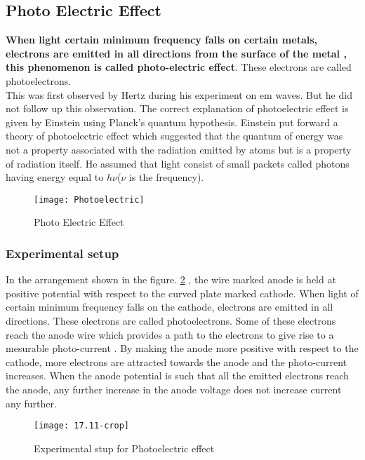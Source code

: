 \subsection{Photo Electric Effect}
\textbf{When light certain minimum frequency falls on certain metals, electrons are emitted in all directions from the surface of the metal ,  this phenomenon is called photo-electric effect}. These electrons are called photoelectrons.\\
This was first observed by Hertz during his experiment on em waves. But he did not follow up this observation. The correct explanation of photoelectric effect is given by Einstein using Planck's quantum hypothesis. Einstein put forward a theory of photoelectric effect which suggested that the quantum of energy was not a property associated with the radiation emitted by atoms but is a property of radiation itself.  He assumed that light consist of small packets called photons having energy equal to $h\nu$($\nu$ is the frequency). 
\begin{figure}[H]
	\centering
	\texttt{[image: Photoelectric]}
	\caption{Photo Electric Effect}
	\label{Photo Electric Effect}
\end{figure}
\subsubsection{Experimental setup} 
In the arrangement shown in the figure. \ref{Photoelectric effect} , the wire marked anode is held at positive potential with respect to the curved plate marked cathode.  When light of certain minimum frequency falls on the cathode, electrons are emitted in all directions. These electrons are called photoelectrons. Some of these electrons reach the anode wire which provides a path to the electrons to give rise to a mesurable photo-current . By making the anode more positive with respect to the cathode, more electrons are attracted towards the anode and the photo-current increases. When the anode potential is such that all the emitted electrons reach the anode, any further increase in the anode voltage does not increase current any further.
\begin{figure}[H]
	\centering
	\texttt{[image: 17.11-crop]}
	\caption{Experimental stup for Photoelectric effect}
	\label{Photoelectric effect}
\end{figure}


